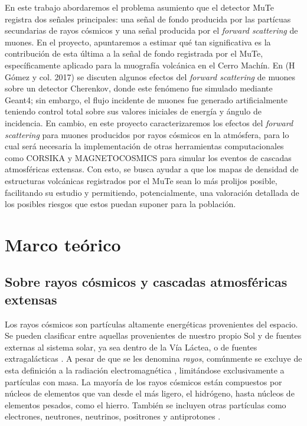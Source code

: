 \documentclass[12pt]{report}
\begin{document}
En este trabajo abordaremos el problema asumiento que el detector MuTe registra dos señales principales: una señal de fondo producida por las partícuas secundarias de rayos cósmicos y una señal producida por el \textit{forward scattering} de muones. En el proyecto, apuntaremos a estimar qué tan significativa es la contribución de esta última a la señal de fondo registrada por el MuTe, específicamente aplicado para la muografía volcánica en el Cerro Machín. En (H Gómez y col. 2017)  \cite{gomez2017forward} se discuten algunos efectos del \textit{forward scattering} de muones sobre un detector Cherenkov, donde este fenómeno fue simulado mediante Geant4; sin embargo, el flujo incidente de muones fue generado artificialmente teniendo control total sobre sus valores iniciales de energía y ángulo de incidencia. En cambio, en este proyecto caracterizaremos los efectos del \textit{forward scattering} para muones producidos por rayos cósmicos en la atmósfera, para lo cual será necesaria la implementación de otras herramientas computacionales como CORSIKA y MAGNETOCOSMICS para simular los eventos de cascadas atmosféricas extensas. Con esto, se busca ayudar a que los mapas de densidad de estructuras volcánicas registrados por el MuTe sean lo más prolijos posible, facilitando su estudio y permitiendo, potencialmente, una valoración detallada de los posibles riesgos que estos puedan suponer para la población.





\section*{Marco teórico}

\subsection*{Sobre rayos cósmicos y cascadas atmosféricas extensas}

\normalsize

Los rayos cósmicos son partículas  altamente energéticas provenientes del espacio. Se pueden clasificar entre aquellas provenientes de nuestro propio Sol y de fuentes externas al sistema solar, ya sea dentro de la Vía Láctea, o de fuentes extragalácticas \cite{moldwin2008introduction}. A pesar de que se les denomina \textit{rayos}, comúnmente se excluye de esta definición a la radiación electromagnética \cite{NASACosmicopia}, limitándose exclusivamente a partículas con masa. La mayoría de los rayos cósmicos están compuestos por núcleos de elementos que van desde el más ligero, el hidrógeno, hasta núcleos de elementos pesados, como el hierro. También se incluyen otras partículas como electrones, neutrones, neutrinos, positrones y antiprotones \cite{NASAImagine}.
\end{document}
